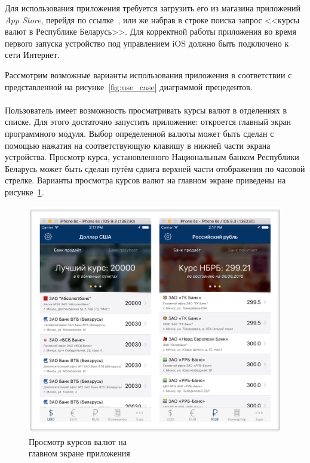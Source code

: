 Для использования приложения требуется загрузить его из магазина
приложений \textit{App Store}, перейдя по ссылке~\cite{itunes_app_link},
или же набрав в строке поиска запрос <<курсы валют в Республике Беларусь>>.
Для корректной работы приложения во время первого запуска устройство
под управлением iOS должно быть подключено к сети Интернет.

Рассмотрим возможные варианты использования приложения в соответствии с
представленной на рисунке~\ref{fig:use_case} диаграммой прецедентов.



\paragraph{}
Пользователь имеет возможность просматривать курсы валют в отделениях в списке.
Для этого достаточно запустить приложение: откроется главный экран программного модуля.
Выбор определенной валюты может быть сделан с помощью нажатия на соответствующую
клавишу в нижней части экрана устройства. Просмотр курса, установленного
Национальным банком Республики Беларусь может быть сделан путём сдвига
верхней части отображения по часовой стрелке.
Варианты просмотра курсов валют на главном экране приведены на
рисунке~\ref{fig:main_screen_manual}.
\begin{figure}[h!]
  \centering
  \includegraphics[width=120mm]{fig/main_screen_manual}
  \caption{Просмотр курсов валют на \\ главном экране приложения}
  \label{fig:main_screen_manual}
\end{figure}


